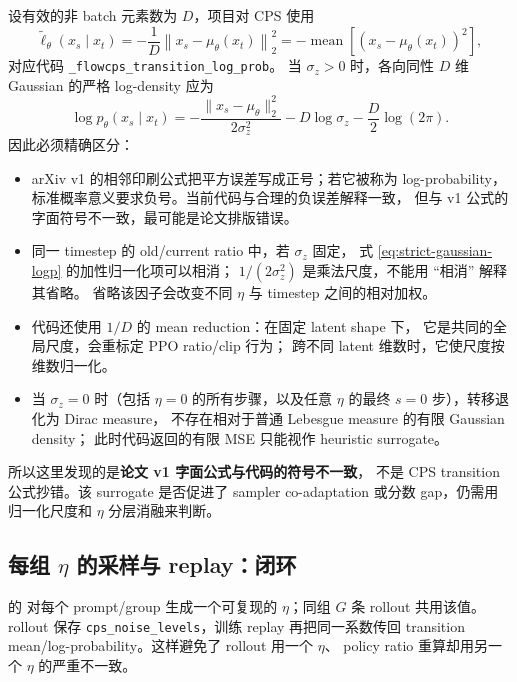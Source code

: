 \documentclass[11pt,a4paper]{article}
\newcommand{\code}[1]{\texttt{#1}}
\begin{document}
设有效的非 batch 元素数为 $D$，项目对 CPS 使用
\begin{equation}
  \widetilde{\ell}_\theta(x_s\mid x_t)
  =-\frac{1}{D}\left\|x_s-\mu_\theta(x_t)\right\|_2^2
  =-\operatorname{mean}\!\left[(x_s-\mu_\theta(x_t))^2\right],
  \label{eq:surrogate-logp}
\end{equation}
对应代码
\code{\_flowcps\_transition\_log\_prob}。
当 $\sigma_z>0$ 时，各向同性 $D$ 维 Gaussian 的严格 log-density 应为
\begin{equation}
  \log p_\theta(x_s\mid x_t)
  =-\frac{\|x_s-\mu_\theta\|_2^2}{2\sigma_z^2}
   -D\log\sigma_z-\frac{D}{2}\log(2\pi).
  \label{eq:strict-gaussian-logp}
\end{equation}
因此必须精确区分：

\begin{itemize}
  \item arXiv v1 的相邻印刷公式把平方误差写成正号；若它被称为
  log-probability，标准概率意义要求负号。当前代码与合理的负误差解释一致，
  但与 v1 公式的字面符号不一致，最可能是论文排版错误。
  \item 同一 timestep 的 old/current ratio 中，若 $\sigma_z$ 固定，
  式 \eqref{eq:strict-gaussian-logp} 的加性归一化项可以相消；
  $1/(2\sigma_z^2)$ 是乘法尺度，不能用 ``相消'' 解释其省略。
  省略该因子会改变不同 $\eta$ 与 timestep 之间的相对加权。
  \item 代码还使用 $1/D$ 的 mean reduction：在固定 latent shape 下，
  它是共同的全局尺度，会重标定 PPO ratio/clip 行为；
  跨不同 latent 维数时，它使尺度按维数归一化。
  \item 当 $\sigma_z=0$ 时（包括 $\eta=0$ 的所有步骤，以及任意
  $\eta$ 的最终 $s=0$ 步），转移退化为 Dirac measure，
  不存在相对于普通 Lebesgue measure 的有限 Gaussian density；
  此时代码返回的有限 MSE 只能视作 heuristic surrogate。
\end{itemize}

所以这里发现的是\textbf{论文 v1 字面公式与代码的符号不一致}，
不是 CPS transition 公式抄错。该 surrogate 是否促进了 sampler co-adaptation
或分数 gap，仍需用归一化尺度和 $\eta$ 分层消融来判断。

\subsection{每组 \texorpdfstring{$\eta$}{eta} 的采样与 replay：闭环}

 的
 对每个 prompt/group
生成一个可复现的 $\eta$；同组 $G$ 条 rollout 共用该值。
rollout 保存 \code{cps\_noise\_levels}，训练 replay 再把同一系数传回
transition mean/log-probability。这样避免了 rollout 用一个 $\eta$、
policy ratio 重算却用另一个 $\eta$ 的严重不一致。
\end{document}
